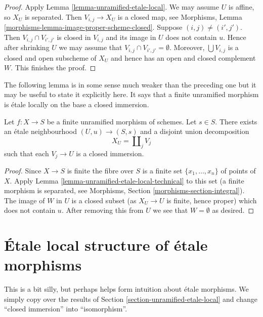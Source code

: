 \begin{proof}
Apply
Lemma \ref{lemma-unramified-etale-local}.
We may assume $U$ is affine, so $X_U$ is separated.
Then $V_{i, j} \to X_U$ is a closed map, see
Morphisms, Lemma \ref{morphisms-lemma-image-proper-scheme-closed}.
Suppose $(i, j) \not = (i', j')$.
Then $V_{i, j} \cap V_{i', j'}$ is closed in $V_{i, j}$ and
its image in $U$ does not contain $u$.
Hence after shrinking $U$ we may assume that
$V_{i, j} \cap V_{i', j'} = \emptyset$. Moreover, $\bigcup V_{i, j}$ is
a closed and open subscheme of $X_U$ and hence has an open and closed
complement $W$. This finishes the proof.
\end{proof}

\noindent
The following lemma is in some sense much weaker than the preceding one
but it may be useful to state it explicitly here. It says that a finite
unramified morphism is \'etale locally on the base a closed immersion.

\begin{lemma}
\label{lemma-finite-unramified-etale-local}
Let $f : X \to S$ be a finite unramified morphism of schemes.
Let $s \in S$.
There exists an \'etale neighbourhood $(U, u) \to (S, s)$
and a disjoint union decomposition
$$
X_U = \coprod\nolimits_j V_j
$$
such that each $V_j \to U$ is a closed immersion.
\end{lemma}

\begin{proof}
Since $X \to S$ is finite the fibre over $S$ is a finite set
$\{x_1, \ldots, x_n\}$ of points of $X$. Apply
Lemma \ref{lemma-unramified-etale-local-technical}
to this set (a finite morphism is separated, see
Morphisms, Section \ref{morphisms-section-integral}).
The image of $W$ in $U$ is a closed
subset (as $X_U \to U$ is finite, hence proper) which does not
contain $u$. After removing this from $U$ we see that $W = \emptyset$
as desired.
\end{proof}




\section{\'Etale local structure of \'etale morphisms}
\label{section-etale-local-etale}

\noindent
This is a bit silly, but perhaps helps form intuition about \'etale
morphisms. We simply copy over the results of
Section \ref{section-unramified-etale-local}
and change ``closed immersion'' into ``isomorphism''.

